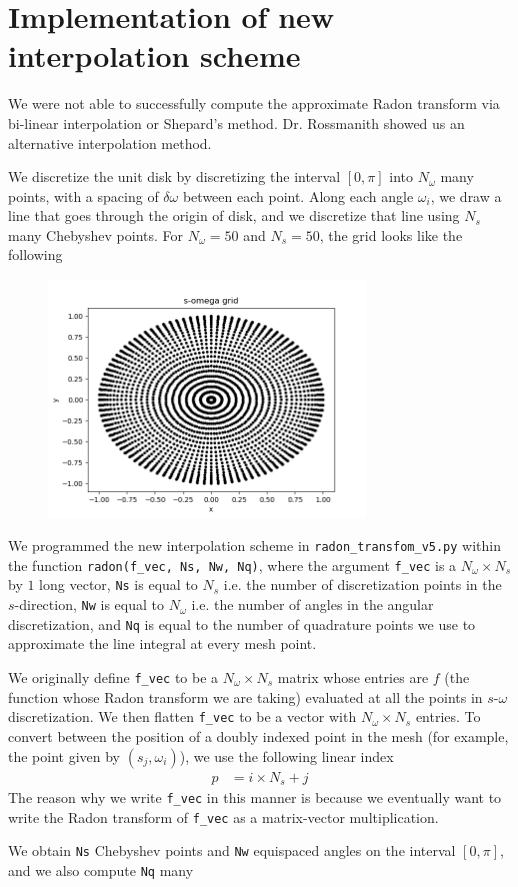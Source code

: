 

\section*{Implementation of new interpolation scheme}
We were not able to successfully compute the approximate Radon transform via bi-linear interpolation or Shepard's method.
Dr. Rossmanith showed us an alternative interpolation method.
\par 
We discretize the unit disk by discretizing the interval $[0, \pi]$ into $N_{\omega}$ many points, with a spacing of $\delta \omega$ between each point.
Along each angle $\omega_{i}$, we draw a line that goes through the origin of disk, and we discretize that line using $N_{s}$ many Chebyshev points.
For $N_{\omega} = 50$ and $N_{s} = 50$, the grid looks like the following
\begin{figure}[H]
	\centering
	\includegraphics[width=0.75\textwidth]{s_omega_grid.png}
\end{figure}
We programmed the new interpolation scheme in \verb|radon_transfom_v5.py| within the function \verb|radon(f_vec, Ns, Nw, Nq)|, where the argument \verb|f_vec| is a $N_{\omega} \times N_s$ by $1$ long vector, \verb|Ns| is equal to $N_{s}$ i.e. the number of discretization points in the $s$-direction, \verb|Nw| is equal to $N_{\omega}$ i.e. the number of angles in the angular discretization, and \verb|Nq| is equal to the number of quadrature points we use to approximate the line integral at every mesh point.
\par
We originally define \verb|f_vec| to be a $N_{\omega} \times N_{s}$ matrix whose entries are $f$ (the function whose Radon transform we are taking) evaluated at all the points in $s$-$\omega$ discretization. 
We then flatten \verb|f_vec| to be a vector with $N_{\omega} \times N_{s}$ entries.
To convert between the position of a doubly indexed point in the mesh (for example, the point given by $(s_{j}, \omega_{i})$), we use the following linear index
\begin{align*}
	p & = i \times N_{s} + j
\end{align*}
The reason why we write \verb|f_vec| in this manner is because we eventually want to write the Radon transform of \verb|f_vec| as a matrix-vector multiplication.
\par
We obtain \verb|Ns| Chebyshev points and \verb|Nw| equispaced angles on the interval $[0, \pi]$, and we also compute \verb|Nq| many 